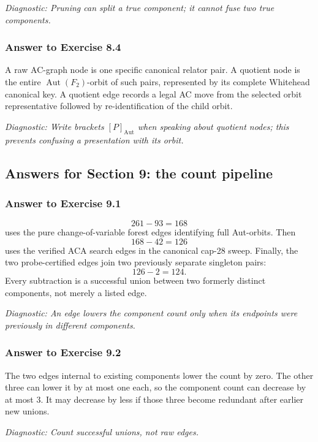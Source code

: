 \documentclass[11pt]{article}
\theoremstyle{definition}
\theoremstyle{remark}
\newcommand{\F}{F_2}
\newcommand{\Aut}{\operatorname{Aut}}
\newcommand{\diagnostic}[1]{\par\smallskip\textit{Diagnostic: #1}}
\begin{document}
\diagnostic{Pruning can split a true component; it cannot fuse two true
components.}

\subsubsection*{Answer to Exercise 8.4}

A raw AC-graph node is one specific canonical relator pair.  A quotient
node is the entire \(\Aut(\F)\)-orbit of such pairs, represented by its
complete Whitehead canonical key.  A quotient edge records a legal AC
move from the selected orbit representative followed by re-identification
of the child orbit.

\diagnostic{Write brackets \([P]_{\Aut}\) when speaking about quotient
nodes; this prevents confusing a presentation with its orbit.}

\subsection*{Answers for Section 9: the count pipeline}

\subsubsection*{Answer to Exercise 9.1}

\[
261-93=168
\]
uses the pure change-of-variable forest edges identifying full Aut-orbits.
Then
\[
168-42=126
\]
uses the verified ACA search edges in the canonical cap-28 sweep.  Finally,
the two probe-certified edges join two previously separate singleton pairs:
\[
126-2=124.
\]
Every subtraction is a successful union between two formerly distinct
components, not merely a listed edge.

\diagnostic{An edge lowers the component count only when its endpoints
were previously in different components.}

\subsubsection*{Answer to Exercise 9.2}

The two edges internal to existing components lower the count by zero.
The other three can lower it by at most one each, so the component count
can decrease by at most \(3\).  It may decrease by less if those three
become redundant after earlier new unions.

\diagnostic{Count successful unions, not raw edges.}
\end{document}
